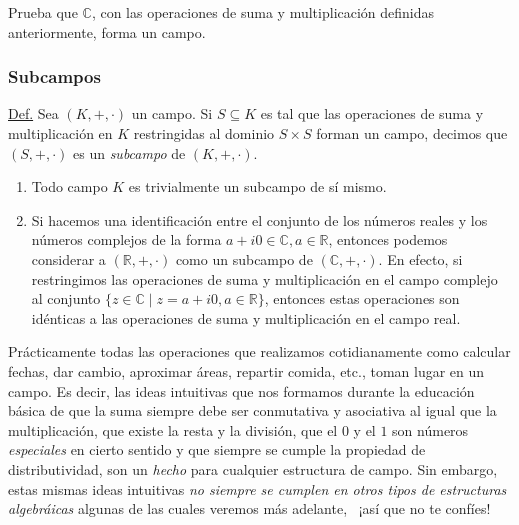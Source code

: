 \documentclass[apuntes]{subfiles}
\begin{document}
\begin{ejer}\label{ejercicio-3}
    Prueba que $\mathbb{C}$, con las operaciones de suma y multiplicación definidas anteriormente, forma un campo.
\end{ejer}


\subsubsection*{Subcampos} \label{Sssec: Subcampos}

\begin{tcolorbox}\label{Def: subcampo}
    
    \underline{Def.} Sea $(K,+,\cdot)$ un campo. Si $S\subseteq K$ es tal que las operaciones de suma y multiplicación en $K$ restringidas al dominio $S\times S$ forman un campo, decimos que $(S,+,\cdot)$ es un \emph{subcampo} de $(K,+,\cdot)$.
\end{tcolorbox}

\begin{obs}\label{obs:1.4}
    \begin{enumerate}[label=(\arabic*)]\leavevmode
    
        \item Todo campo $K$ es trivialmente un subcampo de sí mismo.

        \item Si hacemos una identificación entre el conjunto de los números reales y los números complejos de la forma $a+i0\in\mathbb{C}, a\in\mathbb{R}$, entonces podemos considerar a $(\mathbb{R},+,\cdot)$ como un subcampo de $(\mathbb{C},+,\cdot)$. En efecto, si restringimos las operaciones de suma y multiplicación en el campo complejo al conjunto $\{z\in\mathbb{C}\mid z = a+i0, a\in\mathbb{R}\}$, entonces estas operaciones son idénticas a las operaciones de suma y multiplicación en el campo real.
    \end{enumerate}
\end{obs}

Prácticamente todas las operaciones que realizamos cotidianamente como calcular fechas, dar cambio, aproximar áreas, repartir comida, etc., toman lugar en un campo. Es decir, las ideas intuitivas que nos formamos durante la educación básica de que la suma siempre debe ser conmutativa y asociativa \textemdash al igual que la multiplicación\textemdash, que existe la resta y la división, que el $0$ y el $1$ son números \emph{especiales} en cierto sentido y que siempre se cumple la propiedad de distributividad, son un \emph{hecho} para cualquier estructura de campo. Sin embargo, estas mismas ideas intuitivas \emph{no siempre se cumplen en otros tipos de estructuras algebráicas} \textemdash algunas de las cuales veremos más adelante\textemdash, \ ¡así que no te confíes!
\end{document}
